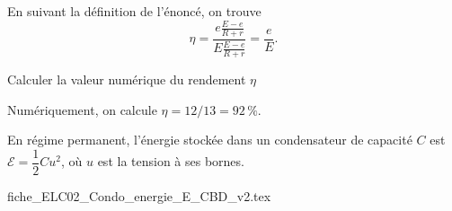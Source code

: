 \begin{corrige}
En suivant la définition de l'énoncé, on trouve
\[
\eta=\frac{e\frac{E-e}{R+r}}{E\frac{E-e}{R+r}}=\frac{e}{E}.
\]
\end{corrige}




\begin{enonce}
Calculer la valeur numérique du rendement $\eta$
\end{enonce}


\begin{corrige}
Numériquement, on calcule $\eta=12/13=92 \, \%$.
\end{corrige}



\newpage




\hauteurLargeurCadreReponse		{8mm}{3.5cm}
\initialisationEntrainement

En régime permanent, l'énergie stockée dans un condensateur de capacité $C$ est $\mathcal{E}=\dfrac{1}{2}Cu^{2}$, où $u$ est  la tension à ses bornes.

\minusSmallskip

\debutEntrainement

\begin{center}
{fiche_ELC02_Condo_energie_E_CBD_v2.tex}
\end{center}


